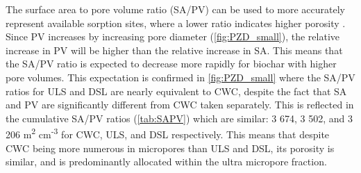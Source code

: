 
\begin{table}
\centering
\caption{Surface area (SA), pore volume (PV), elemental content (C, O, H, N) and ratios for the biochars produced for the batch tests.}
\end{table}

The surface area to pore volume ratio (SA/PV) can be used to more accurately represent available sorption sites, where a lower ratio indicates higher porosity \citep{presser2011SAPV}. Since PV increases by increasing pore diameter (\cref{fig:PZD_small}), the relative increase in PV will be higher than the relative increase in SA. This means that the SA/PV ratio is expected to decrease more rapidly for biochar with higher pore volumes. This expectation is confirmed in \cref{fig:PZD_small} where the SA/PV ratios for ULS and DSL are nearly equivalent to CWC, despite the fact that SA and PV are significantly different from CWC taken separately. This is reflected in the cumulative SA/PV ratios (\cref{tab:SAPV}) which are similar: 3 674, 3 502, and 3 206 m\textsuperscript{2} cm\textsuperscript{-3} for CWC, ULS, and DSL respectively. This means that despite CWC being more numerous in micropores than ULS and DSL, its porosity is similar, and is predominantly allocated within the ultra micropore fraction.

